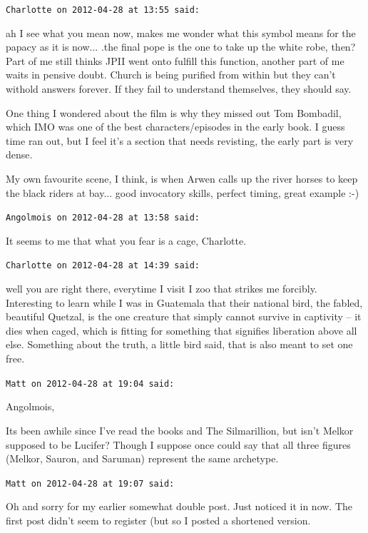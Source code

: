 \begin{footnotesize}
\begin{sffamily}
\hfill

\texttt{Charlotte on 2012-04-28 at 13:55 said:}

ah I see what you mean now, makes me wonder what this symbol means for the papacy as it is now... .the final pope is the one to take up the white robe, then? Part of me still thinks JPII went onto fulfill this function, another part of me waits in pensive doubt. Church is being purified from within but they can't withold answers forever. If they fail to understand themselves, they should say.

One thing I wondered about the film is why they missed out Tom Bombadil, which IMO was one of the best characters/episodes in the early book. I guess time ran out, but I feel it's a section that needs revisting, the early part is very dense.

My own favourite scene, I think, is when Arwen calls up the river horses to keep the black riders at bay... good invocatory skills, perfect timing, great example :-)

\hfill

\texttt{Angolmois on 2012-04-28 at 13:58 said:}

It seems to me that what you fear is a cage, Charlotte.

\hfill

\texttt{Charlotte on 2012-04-28 at 14:39 said:}

well you are right there, everytime I visit I zoo that strikes me forcibly. Interesting to learn while I was in Guatemala that their national bird, the fabled, beautiful Quetzal, is the one creature that simply cannot survive in captivity -- it dies when caged, which is fitting for something that signifies liberation above all else. Something about the truth, a little bird said, that is also meant to set one free.

\hfill

\texttt{Matt on 2012-04-28 at 19:04 said:}

Angolmois,

Its been awhile since I've read the books and The Silmarillion, but isn't Melkor supposed to be Lucifer? Though I suppose once could say that all three figures (Melkor, Sauron, and Saruman) represent the same archetype.

\hfill

\texttt{Matt on 2012-04-28 at 19:07 said:}

Oh and sorry for my earlier somewhat double post. Just noticed it in now. The first post didn't seem to register (but so I posted a shortened version.


\end{sffamily}
\end{footnotesize}
